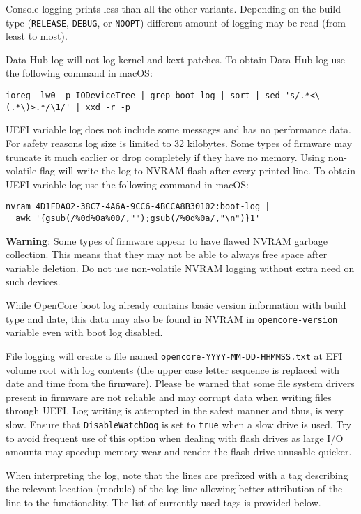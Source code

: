 \documentclass[]{article}
\begin{document}
\begin{enumerate}
  Console logging prints less than all the other variants.
  Depending on the build type (\texttt{RELEASE}, \texttt{DEBUG}, or
  \texttt{NOOPT}) different amount of logging may be read (from least to most).

  Data Hub log will not log kernel and kext patches. To obtain Data Hub log use
  the following command in macOS:
\begin{lstlisting}[label=dhublog, style=ocbash]
ioreg -lw0 -p IODeviceTree | grep boot-log | sort | sed 's/.*<\(.*\)>.*/\1/' | xxd -r -p
\end{lstlisting}

  UEFI variable log does not include some messages and has no performance data. For safety
  reasons log size is limited to 32 kilobytes. Some types of firmware may truncate it much earlier
  or drop completely if they have no memory. Using non-volatile flag will write the log to
  NVRAM flash after every printed line. To obtain UEFI variable log use the following command
  in macOS:
\begin{lstlisting}[label=nvramlog, style=ocbash]
nvram 4D1FDA02-38C7-4A6A-9CC6-4BCCA8B30102:boot-log |
  awk '{gsub(/%0d%0a%00/,"");gsub(/%0d%0a/,"\n")}1'
\end{lstlisting}

  \textbf{Warning}: Some types of firmware appear to have flawed NVRAM garbage collection.
  This means that they may not be able to always free space after variable deletion.
  Do not use non-volatile NVRAM logging without extra need on such devices.

  While OpenCore boot log already contains basic version information with build type and
  date, this data may also be found in NVRAM in \texttt{opencore-version} variable
  even with boot log disabled.

  File logging will create a file named \texttt{opencore-YYYY-MM-DD-HHMMSS.txt} at EFI
  volume root with log contents (the upper case letter sequence is replaced with date
  and time from the firmware). Please be warned that some file system drivers present
  in firmware are not reliable and may corrupt data when writing files through UEFI.
  Log writing is attempted in the safest manner and thus, is very slow. Ensure that
  \texttt{DisableWatchDog} is set to \texttt{true} when a slow drive is used. Try to
  avoid frequent use of this option when dealing with flash drives as large I/O
  amounts may speedup memory wear and render the flash drive unusable quicker.

  When interpreting the log, note that the lines are prefixed with a tag describing
  the relevant location (module) of the log line allowing better attribution of the line
  to the functionality. The list of currently used tags is provided below.


\end{enumerate}
\end{document}
